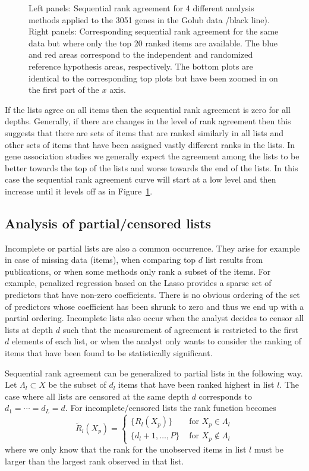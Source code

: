 \documentclass[12pt,a4paper]{article}
\theoremstyle{plain}
\begin{document}
\begin{figure}[htbp]
\begin{center}
 \end{center}
 \caption{Left panels: Sequential rank agreement for 4 different
   analysis methods applied to the 3051 genes in the Golub data /black
   line). Right
   panels: Corresponding sequential rank agreement for the same data
   but where only the top 20 ranked items are available. The blue and
   red areas correspond to the independent and randomized reference
   hypothesis areas, respectively. The bottom plots are identical to
   the corresponding top plots but have been zoomed in on the first
   part of the $x$ axis.}
 \label{fig:example1}
 \end{figure}

 If the lists agree on all items then the sequential rank agreement is
 zero for all depths. Generally, if there are changes in the level of
 rank agreement then this suggests that there are sets of items that
 are ranked similarly in all lists and other sets of items that have
 been assigned vastly different ranks in the lists. In gene
 association studies we generally expect the agreement among the lists
 to be better towards the top of the lists and worse towards the end
 of the lists. In this case the sequential rank agreement curve will
 start at a low level and then increase until it levels off as in
 Figure~\ref{fig:example1}.

\subsection{Analysis of partial/censored lists}
Incomplete or partial lists are also a common occurrence. They arise
for example in case of missing data (items), when comparing top $d$
list results from publications, or when some methods only rank a
subset of the items. For example, penalized regression based on the
Lasso provides a sparse set of predictors that have non-zero
coefficients. There is no obvious ordering of the set of predictors
whose coefficient has been shrunk to zero and thus we end up with a
partial ordering. Incomplete lists also occur when the analyst decides
to censor all lists at depth $d$ such that the measurement of
agreement is restricted to the first $d$ elements of each list, or
when the analyst only wants to consider the ranking of items that have
been found to be statistically significant.

Sequential rank agreement can be generalized to partial lists in the
following way. Let $\Lambda_l\subset X$ be the subset of $d_l$ items
that have been ranked highest in list $l$.  The case where all lists are
censored at the same depth $d$ corresponds to $d_1=\cdots=d_L=d$. For
incomplete/censored lists the rank function becomes
\begin{equation}
  \widetilde R_l(X_p) = \left\{\begin{array}{cl} \{R_l(X_p)\} & \text{ for } X_p\in \Lambda_l \\
      \{d_l+1,\dots,P\} & \text{ for } X_p \not\in \Lambda_l\end{array}\right.
\end{equation}
where we only know that the rank for the unobserved items in list $l$
must be larger than the largest rank observed in that list.
\end{document}
